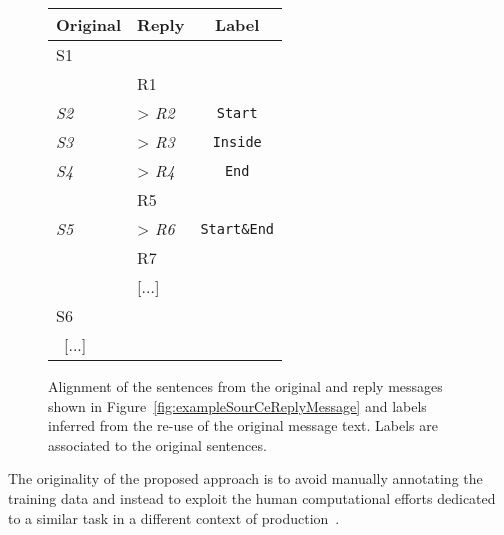 \begin{figure}
\begin{minipage}{.63\textwidth}
        \caption{An original message and its reply (\textit{ubuntu-users} email archive). Sentences have been tagged to facilitate the discussion. %
        }\label{fig:exampleSourCeReplyMessage}
\end{minipage}
\hfill
\begin{minipage}{.3\textwidth}
\small\centering
\begin{tabular}{*{2}{|l}|c|}
\toprule
\textbf{Original} & \textbf{Reply} & \textbf{Label}\\
	\midrule
S1  & & \\
    & R1 & \\
\textit{S2}  & > \textit{R2}& \texttt{Start}\\
\textit{S3}  & > \textit{R3}& \texttt{Inside}\\
\textit{S4}  & > \textit{R4}& \texttt{End}\\
    & R5 & \\
\textit{S5}  & > \textit{R6} & \texttt{Start\&End}\\
    & R7 & \\
    & [...] & \\
S6    &  & \\ \ 
[...] \    &  & \\
	\bottomrule
\end{tabular}
\caption{Alignment of the sentences from the original and reply messages shown in Figure~\ref{fig:exampleSourCeReplyMessage} and labels inferred from the re-use of the original message text. Labels are associated to the original sentences.}
\label{fig:exampleSegmentationLabels}
\end{minipage}
\end{figure}
%
The originality of the proposed approach is to avoid manually annotating the training data and instead to exploit the human computational efforts dedicated to a similar task in a different context of production~\cite{ahn:2006:computer}. 
